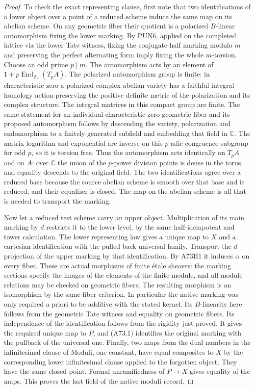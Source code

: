 \begin{proof}
To check the exact representing clause, first note that two
identifications of a lower object over a point of a reduced scheme
induce the same map on its abelian scheme. On any geometric fiber
their quotient is a polarized $B$-linear automorphism fixing the
lower marking. By PUN6, applied on the completed lattice via the
lower Tate witness, fixing the conjugate-half marking modulo $m$
and preserving the perfect alternating form imply fixing the whole
$m$-torsion. Choose an odd prime $p\mid m$. The automorphism acts
by an element of $1+p\operatorname{End}_{\mathbb Z_p}(T_p A)$.
The polarized automorphism group is finite: in characteristic zero
a polarized complex abelian variety has a faithful integral homology
action preserving the positive definite metric of the polarization
and its complex structure. The integral matrices in this compact
group are finite. The same statement for an individual
characteristic-zero geometric fiber and its proposed automorphism
follows by descending the variety, polarization and endomorphism
to a finitely generated subfield and embedding that field in
$\mathbb C$. The matrix logarithm and exponential are inverse on
this $p$-adic congruence subgroup for odd $p$, so it is torsion free.
Thus the automorphism acts identically on $T_p A$ and on $A$:
over $\mathbb C$ the union of the $p$-power division points is
dense in the torus, and equality descends to the original field.
The two identifications agree over a reduced base because the
source abelian scheme is smooth over that base and is reduced, and
their equalizer is closed. The map on the abelian scheme is all
that is needed to transport the marking.

Now let a reduced test scheme carry an upper object. Multiplication
of its main marking by $d$ restricts it to the lower level, by the
same half-idempotent and tower calculation. The lower representing
law gives a unique map to $X$ and a cartesian identification with
the pulled-back universal family. Transport the $d$-projection of
the upper marking by that identification. By A73H1 it induces
$\alpha$ on every fiber. These are actual morphisms of finite
\'etale sheaves: the marking sections specify the images of
the elements of the finite module, and all module relations may
be checked on geometric fibers. The resulting morphism is an
isomorphism by the same fiber criterion. In particular the native
marking was only required a priori to be additive with the stated
kernel. Its $B$-linearity here follows from the geometric Tate
witness and equality on geometric fibers. Its independence of the
identification follows from the rigidity just proved.
It gives the required unique map to $P$, and (A73.1) identifies
the original marking with the pullback of the universal one.
Finally, two maps from the dual numbers in the infinitesimal clause
of $\mathrm{Moduli}$, one constant, have equal composites to $X$ by
the corresponding lower infinitesimal clause applied to the forgotten
object. They have the same closed point. Formal unramifiedness of
$P\to X$ gives equality of the maps. This proves the last field of
the native moduli record.
\end{proof}

